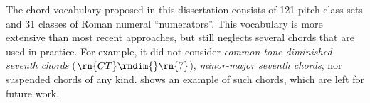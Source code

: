 
The chord vocabulary proposed in this dissertation consists
of 121 pitch class sets and 31 classes of Roman numeral
``numerators''. This vocabulary is more extensive than most
recent approaches, but still neglects several chords that
are used in practice. For example, it did not consider
\emph{common-tone diminished seventh chords}
($\rn{CT}\rndim{}\rn{7}$), \emph{minor-major seventh
chords}, nor suspended chords of any kind.
 shows an example of such
chords, which are left for future work.

